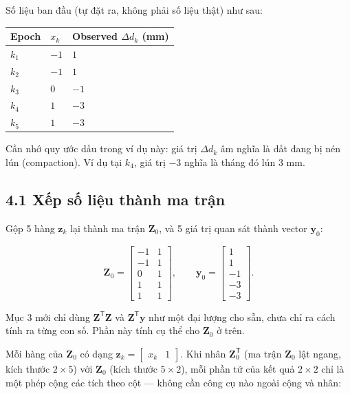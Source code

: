 \documentclass[12pt]{article}
\begin{document}
Số liệu ban đầu (tự đặt ra, không phải số liệu thật) như sau:

\begin{longtable}{@{}lll@{}}
\toprule
Epoch & $x_k$ & Observed $\Delta d_k$ (mm) \\
\midrule
$k_1$ & $-1$ & $1$ \\
$k_2$ & $-1$ & $1$ \\
$k_3$ & $0$ & $-1$ \\
$k_4$ & $1$ & $-3$ \\
$k_5$ & $1$ & $-3$ \\
\bottomrule
\end{longtable}

Cần nhớ quy ước dấu trong ví dụ này: giá trị $\Delta d_k$ âm nghĩa là đất đang bị nén lún (compaction). Ví dụ tại $k_4$, giá trị $-3$ nghĩa là tháng đó lún 3 mm.

\subsection{4.1 Xếp số liệu thành ma trận}

Gộp 5 hàng $\boldsymbol{z}_k$ lại thành ma trận $\boldsymbol{Z}_0$, và 5 giá trị quan sát thành vector $\boldsymbol{y}_0$:

\[
\boldsymbol{Z}_0
=
\begin{bmatrix}
-1 & 1\\
-1 & 1\\
0 & 1\\
1 & 1\\
1 & 1
\end{bmatrix},
\qquad
\boldsymbol{y}_0
=
\begin{bmatrix}
1\\
1\\
-1\\
-3\\
-3
\end{bmatrix}.
\]

Mục 3 mới chỉ dùng $\boldsymbol{Z}^{\mathsf{T}}\boldsymbol{Z}$ và $\boldsymbol{Z}^{\mathsf{T}}\boldsymbol{y}$ như một đại lượng cho sẵn, chưa chỉ ra cách tính ra từng con số. Phần này tính cụ thể cho $\boldsymbol{Z}_0$ ở trên.

Mỗi hàng của $\boldsymbol{Z}_0$ có dạng $\boldsymbol{z}_k = \begin{bmatrix}x_k & 1\end{bmatrix}$. Khi nhân $\boldsymbol{Z}_0^{\mathsf{T}}$ (ma trận $\boldsymbol{Z}_0$ lật ngang, kích thước $2\times5$) với $\boldsymbol{Z}_0$ (kích thước $5\times2$), mỗi phần tử của kết quả $2\times2$ chỉ là một phép cộng các tích theo cột — không cần công cụ nào ngoài cộng và nhân:
\end{document}
